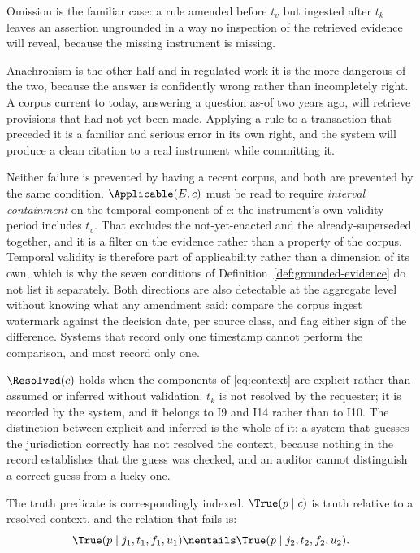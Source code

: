 Omission is the familiar case: a rule amended before $t_v$ but ingested after $t_k$
leaves an assertion ungrounded in a way no inspection of the retrieved evidence will
reveal, because the missing instrument is missing.

Anachronism is the other half and in regulated work it is the more dangerous of the two,
because the answer is confidently wrong rather than incompletely right. A corpus current
to today, answering a question as-of two years ago, will retrieve provisions that had
not yet been made. Applying a rule to a transaction that preceded it is a familiar and
serious error in its own right, and the system will produce a clean citation to a real
instrument while committing it.

Neither failure is prevented by having a recent corpus, and both are prevented by the
same condition. $\Applicable(E, c)$ must be read to require \emph{interval containment}
on the temporal component of $c$: the instrument's own validity period includes $t_v$.
That excludes the not-yet-enacted and the already-superseded together, and it is a
filter on the evidence rather than a property of the corpus. Temporal validity is
therefore part of applicability rather than a dimension of its own, which is why the
seven conditions of Definition~\ref{def:grounded-evidence} do not list it separately. Both directions are also detectable at the aggregate level
without knowing what any amendment said: compare the corpus ingest watermark against
the decision date, per source class, and flag either sign of the difference. Systems that record only one timestamp cannot
perform the comparison, and most record only one.

$\Resolved(c)$ holds when the components of \eqref{eq:context} are explicit rather
than assumed or inferred without validation. $t_k$ is not resolved by the requester;
it is recorded by the system, and it belongs to I9 and I14 rather than to I10. The distinction between explicit and inferred is the whole of
it: a system that guesses the jurisdiction correctly has not resolved the context,
because nothing in the record establishes that the guess was checked, and an
auditor cannot distinguish a correct guess from a lucky one.

The truth predicate is correspondingly indexed. $\True(p \mid c)$ is truth relative
to a resolved context, and the relation that fails is:
\begin{equation}
  \True(p \mid j_1, t_1, f_1, u_1)
  \nentails
  \True(p \mid j_2, t_2, f_2, u_2).
  \label{eq:no-transfer}
\end{equation}


